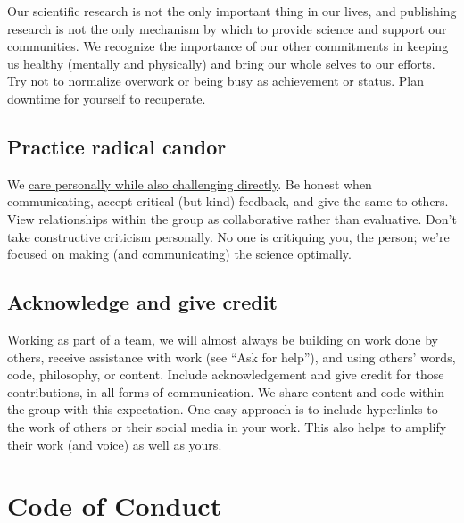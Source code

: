\documentclass[
  letterpaper,
  DIV=11,
  numbers=noendperiod]{scrreprt}
\begin{document}
Our scientific research is not the only important thing in our lives,
and publishing research is not the only mechanism by which to provide
science and support our communities. We recognize the importance of our
other commitments in keeping us healthy (mentally and physically) and
bring our whole selves to our efforts. Try not to normalize overwork or
being busy as achievement or status. Plan downtime for yourself to
recuperate.

\hypertarget{practice-radical-candor}{%
\section{Practice radical candor}\label{practice-radical-candor}}

We \href{https://www.radicalcandor.com/}{care personally while also
challenging directly}. Be honest when communicating, accept critical
(but kind) feedback, and give the same to others. View relationships
within the group as collaborative rather than evaluative. Don't take
constructive criticism personally. No one is critiquing you, the person;
we're focused on making (and communicating) the science optimally.

\hypertarget{acknowledge-and-give-credit}{%
\section{Acknowledge and give
credit}\label{acknowledge-and-give-credit}}

Working as part of a team, we will almost always be building on work
done by others, receive assistance with work (see ``Ask for help''), and
using others' words, code, philosophy, or content. Include
acknowledgement and give credit for those contributions, in all forms of
communication. We share content and code within the group with this
expectation. One easy approach is to include hyperlinks to the work of
others or their social media in your work. This also helps to amplify
their work (and voice) as well as yours.


\hypertarget{sec-code}{%
\chapter{Code of Conduct}\label{sec-code}}
\end{document}
